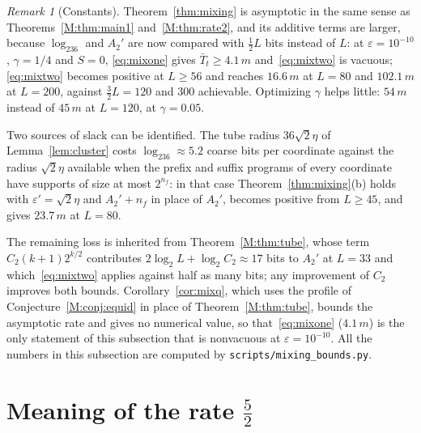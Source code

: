 \documentclass[aps,prx,twocolumn,superscriptaddress,nofootinbib,longbibliography]{revtex4-2}
\theoremstyle{plain}
\theoremstyle{definition}
\theoremstyle{remark}
\newtheorem{remark}{Remark}
\begin{document}
\begin{remark}[Constants]\label{rem:mixconst}
Theorem~\ref{thm:mixing} is asymptotic in the same sense as Theorems~\ref{M:thm:main1} and~\ref{M:thm:rate2}, and its additive terms are larger, because $\log_236$ and $A_2'$ are now compared with $\tfrac12L$ bits instead of $L$: at $\varepsilon=10^{-10}$, $\gamma=1/4$ and $S=0$, \eqref{eq:mixone} gives $\bar T_t\ge4.1\,m$ and~\eqref{eq:mixtwo} is vacuous; \eqref{eq:mixtwo} becomes positive at $L\ge56$ and reaches $16.6\,m$ at $L=80$ and $102.1\,m$ at $L=200$, against $\tfrac32L=120$ and $300$ achievable. Optimizing $\gamma$ helps little: $54\,m$ instead of $45\,m$ at $L=120$, at $\gamma=0.05$. 

Two sources of slack can be identified. The tube radius $36\sqrt2\eta$ of Lemma~\ref{lem:cluster} costs $\log_236\approx5.2$ coarse bits per coordinate against the radius $\sqrt2\eta$ available when the prefix and suffix programs of every coordinate have supports of size at most $2^{n_f}$: in that case Theorem~\ref{thm:mixing}(b) holds with $\varepsilon'=\sqrt2\eta$ and $A_2'+n_f$ in place of $A_2'$, becomes positive from $L\ge45$, and gives $23.7\,m$ at $L=80$. 

The remaining loss is inherited from Theorem~\ref{M:thm:tube}, whose term $C_2(k+1)2^{k/2}$ contributes $2\log_2L+\log_2C_2\approx17$ bits to $A_2'$ at $L=33$ and which~\eqref{eq:mixtwo} applies against half as many bits; any improvement of $C_2$ improves both bounds. Corollary~\ref{cor:mixq}, which uses the profile of Conjecture~\ref{M:conj:equid} in place of Theorem~\ref{M:thm:tube}, bounds the asymptotic rate and gives no numerical value, so that~\eqref{eq:mixone} ($4.1\,m$) is the only statement of this subsection that is nonvacuous at $\varepsilon=10^{-10}$. All the numbers in this subsection are computed by \texttt{scripts/mixing\_bounds.py}.
\end{remark}

\section{Meaning of the rate \texorpdfstring{$\tfrac52$}{5/2}}\label{sec:what52}
\end{document}
